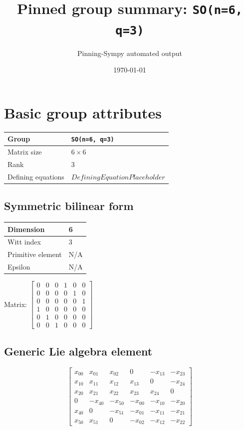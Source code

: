 \documentclass[11pt]{article}
\title{Pinned group summary: \texttt{SO(n=6, q=3)}}
\author{Pinning-Sympy automated output}
\date{\today}
\theoremstyle{definition}
\begin{document}
\maketitle
\tableofcontents

\newpage

\section{Basic group attributes}

\begin{tabular}{|l|l|}
	\hline
    Group & \texttt{SO(n=6, q=3)} \\
	\hline
    Matrix size & $6 \times 6$ \\
	\hline
    Rank & $3$ \\
	\hline
	Defining equations & $DefiningEquationPlaceholder$ \\
	\hline
\end{tabular}

\subsection{Symmetric bilinear form}
\begin{tabular}{|l|l|}
    \hline
    Dimension & 6 \\
    \hline
    Witt index & 3 \\
    \hline
    Primitive element & N/A \\
    \hline
    Epsilon & N/A \\
    \hline
\end{tabular}

\bigskip
\noindent Matrix: \(
\left[\begin{matrix}0 & 0 & 0 & 1 & 0 & 0\\0 & 0 & 0 & 0 & 1 & 0\\0 & 0 & 0 & 0 & 0 & 1\\1 & 0 & 0 & 0 & 0 & 0\\0 & 1 & 0 & 0 & 0 & 0\\0 & 0 & 1 & 0 & 0 & 0\end{matrix}\right]
\)



\subsection{Generic Lie algebra element}
\[
\left[\begin{matrix}x_{0 0} & x_{0 1} & x_{0 2} & 0 & - x_{1 3} & - x_{2 3}\\x_{1 0} & x_{1 1} & x_{1 2} & x_{1 3} & 0 & - x_{2 4}\\x_{2 0} & x_{2 1} & x_{2 2} & x_{2 3} & x_{2 4} & 0\\0 & - x_{4 0} & - x_{5 0} & - x_{0 0} & - x_{1 0} & - x_{2 0}\\x_{4 0} & 0 & - x_{5 1} & - x_{0 1} & - x_{1 1} & - x_{2 1}\\x_{5 0} & x_{5 1} & 0 & - x_{0 2} & - x_{1 2} & - x_{2 2}\end{matrix}\right]
\]
\end{document}
